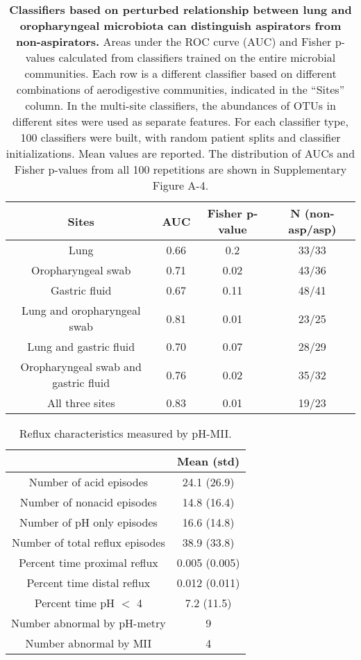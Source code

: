 \begin{table}[H]
\begin{center}
\begin{tabular}{cccc}
  Sites & AUC & Fisher p-value & N (non-asp/asp) \\
 \midrule
Lung & 0.66	& 0.2 & 33/33 \\
Oropharyngeal swab & 0.71 & 0.02 & 43/36 \\
Gastric fluid & 0.67 & 0.11 & 48/41 \\
Lung and oropharyngeal swab & 0.81 & 0.01 & 23/25 \\
Lung and gastric fluid & 0.70 & 0.07 & 28/29 \\
Oropharyngeal swab and gastric fluid & 0.76 & 0.02 & 35/32 \\
All three sites & 0.83 & 0.01 & 19/23 \\
\bottomrule
\end{tabular}
\caption{\textbf{Classifiers based on perturbed relationship between lung and oropharyngeal microbiota can distinguish aspirators from non-aspirators.} Areas under the ROC curve (AUC) and Fisher p-values calculated from classifiers trained on the entire microbial communities. Each row is a different classifier based on different combinations of aerodigestive communities, indicated in the ``Sites'' column. In the multi-site classifiers, the abundances of OTUs in different sites were used as separate features. For each classifier type, 100 classifiers were built, with random patient splits and classifier initializations. Mean values are reported. The distribution of AUCs and Fisher p-values from all 100 repetitions are shown in Supplementary Figure A-4.}\label{tab6}
\end{center}
\end{table}

\begin{table}[H]
\begin{center}
\begin{tabular}{cc}
 & Mean (std) \\
 \midrule
Number of acid episodes & 24.1 (26.9) \\
Number of nonacid episodes & 14.8 (16.4) \\
Number of pH only episodes & 16.6 (14.8) \\
Number of total reflux episodes & 38.9 (33.8) \\
Percent time proximal reflux & 0.005 (0.005) \\
Percent time distal reflux & 0.012 (0.011) \\
Percent time pH $<$ 4 & 7.2 (11.5) \\
Number abnormal by pH-metry & 9 \\
Number abnormal by MII & 4 \\
\bottomrule
\end{tabular}
\caption{Reflux characteristics measured by pH-MII.}\label{tab7}
\end{center}
\end{table}

